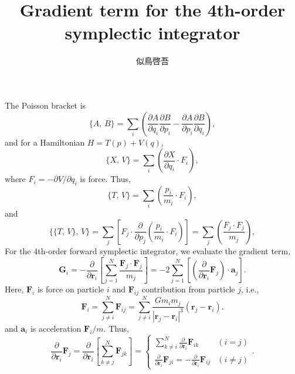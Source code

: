 \documentclass[11pt]{jsarticle}
\title{Gradient term for the 4th-order symplectic integrator}
\author{似鳥啓吾}
\begin{document}
\maketitle

The Poisson bracket is
\begin{equation}
\{A,\,B\} = \sum_i \left( 
		\frac{\partial A}{\partial q_i}\frac{\partial B }{\partial p_i} -
		\frac{\partial A}{\partial p_i}\frac{\partial B }{\partial q_i} 
	   	\right),
\end{equation}
and for a Hamiltonian $H = T(p) + V(q)$,
\begin{equation}
\{X,\,V\} = \sum_i \left( 
		\frac{\partial X}{\partial q_i} \cdot F_i
	   	\right),
\end{equation}
where $F_i = -\partial V / \partial q_i$ is force.
Thus,
\begin{equation}
\{T,\,V\} = \sum_i \left( 
		\frac{p_i}{m_i} \cdot F_i
	   	\right),
\end{equation}
and
\begin{equation}
\{\{T,\,V\},\, V\} = \sum_j \left[ F_j \cdot \frac{\partial }{\partial p_j} 
	\left( \frac{p_i}{m_i} \cdot F_i \right) \right] 
	= \sum_j \left( \frac{F_j \cdot F_j}{m_j} \right),
\end{equation}
For the 4th-order forward symplectic integrator, we evaluate the
gradient term,
\begin{equation}
\bm G_i = -\frac{\partial}{\partial \bm r_i}
\left[ \sum_{j=1}^N \frac{\bm F_j \cdot \bm F_j}{m_j} \right]
= -2 \sum_{j=1}^N \left[ \left( \frac{\partial}{\partial \bm r_i} \bm F_j \right) \cdot  \bm a_j \right].
\end{equation}
Here, $\bm F_i$ is force on particle $i$ and $\bm F_{ij}$ contribution from
particle $j$, i.e.,
\begin{equation}
\bm F_i = \sum_{j \neq i}^N \bm F_{ij}
= \sum_{j \neq i}^N \frac{G m_i m_j}{| \bm r_j - \bm r_i |^3}(\bm r_j - \bm r_i).
\end{equation}
and $\bm a_i$ is acceleration $\bm F_i / m$.
Thus,
\begin{equation}
\frac{\partial}{\partial \bm r_i} \bm F_j 
= 
\frac{\partial}{\partial \bm r_i} \left[ \sum_{k \neq j}^N \bm F_{jk} \right]
=
\begin{cases}
\displaystyle \sum_{k \neq i}^N \frac{\partial}{\partial \bm r_i} \bm F_{ik} & (i = j) \\
\displaystyle \frac{\partial}{\partial \bm r_i} \bm F_{ji} = - \frac{\partial}{\partial \bm r_i} \bm F_{ij} & (i \neq j)
\end{cases}.
\end{equation}
\end{document}
